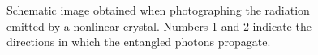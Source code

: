\begin{figure}
\centering


\caption{Schematic image obtained when photographing the radiation emitted by a nonlinear crystal.
  Numbers 1 and 2 indicate the directions in which the entangled photons propagate.}
\label{figEntangGen2}
\end{figure}